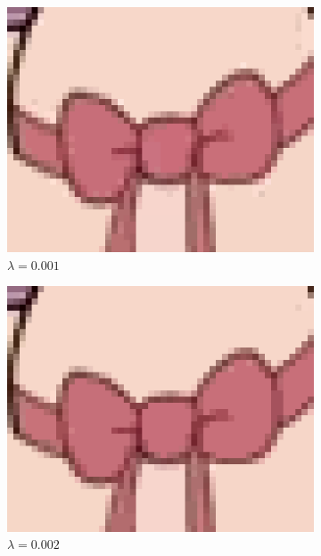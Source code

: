 \documentclass[10pt,twocolumn,letterpaper]{article}
\begin{document}
\begin{figure}
\centering
\begin{subfigure}{.48\linewidth}
\includegraphics[width=\linewidth]{gradminResults/gradmin_bow_large_0001.png}
\caption{$\lambda = 0.001$}
\end{subfigure}
\begin{subfigure}{.48\linewidth}
\includegraphics[width=\linewidth]{gradminResults/gradmin_bow_large_0002.png}
\caption{$\lambda = 0.002$}
\end{subfigure}
\begin{subfigure}{.48\linewidth}

\end{subfigure}
\end{figure}
\end{document}
